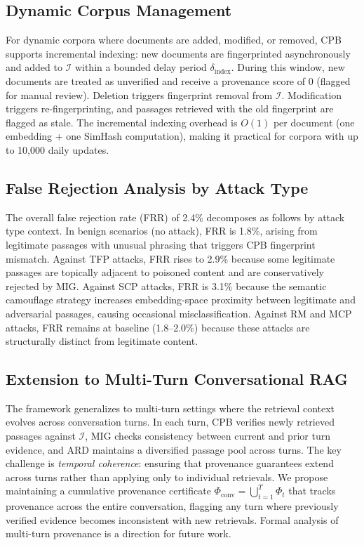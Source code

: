 \documentclass[journal,10pt]{IEEEtran}
\newcommand{\calI}{\mathcal{I}}
\begin{document}
\subsection{Dynamic Corpus Management}
For dynamic corpora where documents are added, modified, or removed, CPB supports incremental indexing: new documents are fingerprinted asynchronously and added to $\calI$ within a bounded delay period $\delta_{\text{index}}$. During this window, new documents are treated as unverified and receive a provenance score of 0 (flagged for manual review). Deletion triggers fingerprint removal from $\calI$. Modification triggers re-fingerprinting, and passages retrieved with the old fingerprint are flagged as stale. The incremental indexing overhead is $O(1)$ per document (one embedding + one SimHash computation), making it practical for corpora with up to 10{,}000 daily updates.

\subsection{False Rejection Analysis by Attack Type}
The overall false rejection rate (FRR) of 2.4\% decomposes as follows by attack type context. In benign scenarios (no attack), FRR is 1.8\%, arising from legitimate passages with unusual phrasing that triggers CPB fingerprint mismatch. Against TFP attacks, FRR rises to 2.9\% because some legitimate passages are topically adjacent to poisoned content and are conservatively rejected by MIG. Against SCP attacks, FRR is 3.1\% because the semantic camouflage strategy increases embedding-space proximity between legitimate and adversarial passages, causing occasional misclassification. Against RM and MCP attacks, FRR remains at baseline (1.8--2.0\%) because these attacks are structurally distinct from legitimate content.

\subsection{Extension to Multi-Turn Conversational RAG}
The framework generalizes to multi-turn settings where the retrieval context evolves across conversation turns. In each turn, CPB verifies newly retrieved passages against $\calI$, MIG checks consistency between current and prior turn evidence, and ARD maintains a diversified passage pool across turns. The key challenge is \emph{temporal coherence}: ensuring that provenance guarantees extend across turns rather than applying only to individual retrievals. We propose maintaining a cumulative provenance certificate $\Phi_{\text{conv}} = \bigcup_{t=1}^{T} \Phi_t$ that tracks provenance across the entire conversation, flagging any turn where previously verified evidence becomes inconsistent with new retrievals. Formal analysis of multi-turn provenance is a direction for future work.
\end{document}
